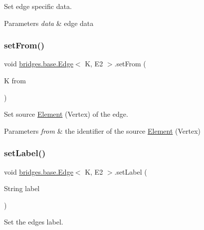 Set edge specific data.


\begin{DoxyParams}{Parameters}
{\em data} & edge data \\
\hline
\end{DoxyParams}
\mbox{\label{classbridges_1_1base_1_1_edge_aef1a55d996fc36217629b884435b9f35}} 
\subsubsection{\texorpdfstring{setFrom()}{setFrom()}}
{\footnotesize\ttfamily void \mbox{\hyperlink{classbridges_1_1base_1_1_edge}{bridges.\+base.\+Edge}}$<$ K, E2 $>$.set\+From (\begin{DoxyParamCaption}\item[{K}]{from }\end{DoxyParamCaption})}



Set source \mbox{\hyperlink{classbridges_1_1base_1_1_element}{Element}} (Vertex) of the edge. 


\begin{DoxyParams}{Parameters}
{\em from} & the identifier of the source \mbox{\hyperlink{classbridges_1_1base_1_1_element}{Element}} (Vertex) \\
\hline
\end{DoxyParams}
\mbox{\label{classbridges_1_1base_1_1_edge_ad5f1d55a3c8caeb975f497dfe4f29242}} 
\subsubsection{\texorpdfstring{setLabel()}{setLabel()}}
{\footnotesize\ttfamily void \mbox{\hyperlink{classbridges_1_1base_1_1_edge}{bridges.\+base.\+Edge}}$<$ K, E2 $>$.set\+Label (\begin{DoxyParamCaption}\item[{String}]{label }\end{DoxyParamCaption})}



Set the edge\textquotesingle{}s label. 



